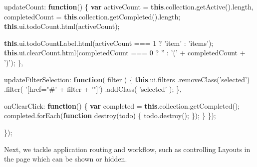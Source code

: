 \documentclass[9pt]{book}
\newenvironment{Shaded}{}{}
\newcommand{\KeywordTok}[1]{\textcolor[rgb]{0.00,0.44,0.13}{\textbf{{#1}}}}
\newcommand{\DataTypeTok}[1]{\textcolor[rgb]{0.56,0.13,0.00}{{#1}}}
\newcommand{\DecValTok}[1]{\textcolor[rgb]{0.25,0.63,0.44}{{#1}}}
\newcommand{\StringTok}[1]{\textcolor[rgb]{0.25,0.44,0.63}{{#1}}}
\newcommand{\OtherTok}[1]{\textcolor[rgb]{0.00,0.44,0.13}{{#1}}}
\newcommand{\FunctionTok}[1]{\textcolor[rgb]{0.02,0.16,0.49}{{#1}}}
\newcommand{\NormalTok}[1]{{#1}}
\begin{document}
\begin{Shaded}
\begin{Highlighting}[]
    \DataTypeTok{updateCount}\NormalTok{: }\KeywordTok{function}\NormalTok{() \{}
      \KeywordTok{var} \NormalTok{activeCount = }\KeywordTok{this}\NormalTok{.}\OtherTok{collection}\NormalTok{.}\FunctionTok{getActive}\NormalTok{().}\FunctionTok{length}\NormalTok{,}
      \NormalTok{completedCount = }\KeywordTok{this}\NormalTok{.}\OtherTok{collection}\NormalTok{.}\FunctionTok{getCompleted}\NormalTok{().}\FunctionTok{length}\NormalTok{;}
      \KeywordTok{this}\NormalTok{.}\OtherTok{ui}\NormalTok{.}\OtherTok{todoCount}\NormalTok{.}\FunctionTok{html}\NormalTok{(activeCount);}

      \KeywordTok{this}\NormalTok{.}\OtherTok{ui}\NormalTok{.}\OtherTok{todoCountLabel}\NormalTok{.}\FunctionTok{html}\NormalTok{(activeCount === }\DecValTok{1} \NormalTok{? }\StringTok{'item'} \NormalTok{: }\StringTok{'items'}\NormalTok{);}
      \KeywordTok{this}\NormalTok{.}\OtherTok{ui}\NormalTok{.}\OtherTok{clearCount}\NormalTok{.}\FunctionTok{html}\NormalTok{(completedCount === }\DecValTok{0} \NormalTok{? }\StringTok{''} \NormalTok{: }\StringTok{'('} \NormalTok{+ completedCount + }\StringTok{')'}\NormalTok{);}
    \NormalTok{\},}

    \DataTypeTok{updateFilterSelection}\NormalTok{: }\KeywordTok{function}\NormalTok{( filter ) \{}
      \KeywordTok{this}\NormalTok{.}\OtherTok{ui}\NormalTok{.}\FunctionTok{filters}
        \NormalTok{.}\FunctionTok{removeClass}\NormalTok{(}\StringTok{'selected'}\NormalTok{)}
        \NormalTok{.}\FunctionTok{filter}\NormalTok{( }\StringTok{'[href="#'} \NormalTok{+ filter + }\StringTok{'"]'}\NormalTok{)}
        \NormalTok{.}\FunctionTok{addClass}\NormalTok{( }\StringTok{'selected'} \NormalTok{);}
    \NormalTok{\},}

    \DataTypeTok{onClearClick}\NormalTok{: }\KeywordTok{function}\NormalTok{() \{}
      \KeywordTok{var} \NormalTok{completed = }\KeywordTok{this}\NormalTok{.}\OtherTok{collection}\NormalTok{.}\FunctionTok{getCompleted}\NormalTok{();}
      \OtherTok{completed}\NormalTok{.}\FunctionTok{forEach}\NormalTok{(}\KeywordTok{function} \FunctionTok{destroy}\NormalTok{(todo) \{}
        \OtherTok{todo}\NormalTok{.}\FunctionTok{destroy}\NormalTok{();}
      \NormalTok{\});}
    \NormalTok{\}}
  \NormalTok{\});}

\NormalTok{\});}
\end{Highlighting}
\end{Shaded}

Next, we tackle application routing and workflow, such as controlling
Layouts in the page which can be shown or hidden.
\end{document}
